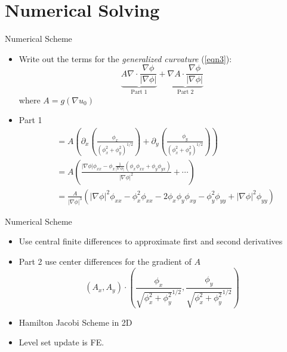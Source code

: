 \documentclass[xcolor=dvipsnames]{beamer}
\begin{document}
\section{Numerical Solving}
\begin{frame}{Numerical Scheme}
\begin{itemize}
    \item Write out the terms for the \textit{generalized curvature} (\ref{eqn3}):
\[
\underbrace{A\nabla\cdot\frac{\nabla\phi}{|\nabla\phi|}}_{\textrm{Part 1}}+\underbrace{\nabla A\cdot\frac{\nabla\phi}{|\nabla\phi|}}_{\textrm{Part 2}}
\]
where $A = g(\nabla u_0)$
\item Part 1 
\begin{align*}
    &=A\left(\partial_x\left(\frac{\phi_x}{(\phi_x^2+\phi_y^2)^{1/2}}\right)+\partial_y\left(\frac{\phi_y}{(\phi_x^2+\phi_y^2)^{1/2}}\right)\right)\\
    &=A\left(\frac{|\nabla\phi|\phi_{xx}-\phi_x\frac{1}{|\nabla\phi|}(\phi_x\phi_{xx}+\phi_y\phi_{yx})}{|\nabla\phi|^2}+\cdots\right)\\
    &=\frac{A}{|\nabla\phi|^3}\left(|\nabla\phi|^2\phi_{xx}-\phi_x^2\phi_{xx}-2\phi_x\phi_y\phi_{xy}-\phi_y^2\phi_{yy}+|\nabla\phi|^2\phi_{yy}\right)
\end{align*}
\end{itemize}
\end{frame}
\begin{frame}{Numerical Scheme}
\begin{itemize}
    \item Use central finite differences to approximate first and second derivatives
    \item Part 2 use center differences for the gradient of $A$
    \[
    (A_x,A_y)\cdot\left(\frac{\phi_x}{\sqrt{\phi_x^2+\phi_y^2}^{1/2}},\frac{\phi_y}{\sqrt{\phi_x^2+\phi_y^2}^{1/2}}\right)
    \]
    \item Hamilton Jacobi Scheme in 2D
    \item Level set update is FE.
\end{itemize}
\end{frame}
\end{document}

